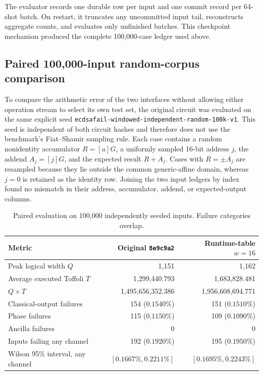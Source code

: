 \documentclass[10pt]{article}
\newcommand{\code}[1]{\texttt{#1}}
\begin{document}
The evaluator records one durable row per input and one commit record per 64-shot batch. On restart, it truncates any uncommitted input tail, reconstructs aggregate counts, and evaluates only unfinished batches. This checkpoint mechanism produced the complete 100,000-case ledger used above.

\subsection{Paired 100,000-input random-corpus comparison}

To compare the arithmetic error of the two interfaces without allowing either operation stream to select its own test set, the original circuit was evaluated on the same explicit seed \code{ecdsafail-windowed-independent-random-100k-v1}. This seed is independent of both circuit hashes and therefore does not use the benchmark's Fiat--Shamir sampling rule. Each case contains a random nonidentity accumulator $R=[a]G$, a uniformly sampled 16-bit address $j$, the addend $A_j=[j]G$, and the expected result $R+A_j$. Cases with $R=\pm A_j$ are resampled because they lie outside the common generic-affine domain, whereas $j=0$ is retained as the identity row. Joining the two input ledgers by index found no mismatch in their address, accumulator, addend, or expected-output columns.

\begin{table}[ht]
\centering
\small
\begin{tabular}{@{}lrr@{}}
\toprule
Metric & Original \texttt{8e9c9a2} & Runtime-table $w=16$ \\
\midrule
Peak logical width $Q$ & 1,151 & 1,162 \\
Average executed Toffoli $T$ & 1,299,440.793 & 1,683,828.481 \\
$Q\times T$ & 1,495,656,352.386 & 1,956,608,694.771 \\
Classical-output failures & 154 ($0.1540\%$) & 151 ($0.1510\%$) \\
Phase failures & 115 ($0.1150\%$) & 109 ($0.1090\%$) \\
Ancilla failures & 0 & 0 \\
Inputs failing any channel & 192 ($0.1920\%$) & 195 ($0.1950\%$) \\
Wilson 95\% interval, any channel & $[0.1667\%,0.2211\%]$ & $[0.1695\%,0.2243\%]$ \\
\bottomrule
\end{tabular}
\caption{Paired evaluation on 100,000 independently seeded inputs. Failure categories overlap.}
\label{tab:paired-100k-results}
\end{table}
\end{document}
